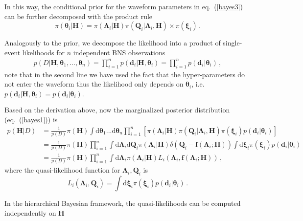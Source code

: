 \documentclass[a4paper,11pt]{article}
\begin{document}
In this way, the conditional prior for the waveform parameters in eq.~(\ref{bayes3}) can be further decomposed with the product rule
\begin{equation}
\label{prior}
\pi(\bm{\theta}_i|\bm{H})=\pi(\bm{\Lambda}_i|\bm{H})\pi(\bm{Q}_i|\bm{\Lambda}_i,\bm{H})\times\pi(\bm{\xi}_i)\,.
\end{equation}

Analogously to the prior, we decompose the likelihood into a product of single-event likelihoods for $n$ independent BNS observations
\begin{subequations}
\begin{align}
p(D|\bm{H},\bm{\theta}_1,...,\bm{\theta}_n)=\prod_{i=1}^{n}p(\bm{d}_i|\bm{H},\bm{\theta}_i)=\prod_{i=1}^{n}p(\bm{d}_i|\bm{\theta}_i)\,,
\end{align}   
\end{subequations}
note that in the second line we have used the fact that the hyper-parameters do not enter the waveform thus the likelihood only depends on $\bm{\theta}_i$, i.e. $p(\bm{d}_i|\bm{H},\bm{\theta}_i)=p(\bm{d}_i|\bm{\theta}_i)$.


Based on the derivation above, now the marginalized posterior distribution (eq.~(\ref{bayes1})) is
\begin{equation}
\label{hierarchical bayes}
\begin{aligned}
p(\bm{H}|D)&=\frac{1}{p(D)}\pi(\bm{H})\int \text{d}\bm{\theta}_1...\text{d}\bm{\theta}_n \prod_{i=1}^n \left[\pi(\bm{\Lambda}_i|\bm{H})\pi(\bm{Q}_i|\bm{\Lambda}_i,\bm{H})\pi(\bm{\xi}_i)p(\bm{d}_i|\bm{\theta}_i)\right] \\
&=\frac{1}{p(D)} \pi(\bm{H}) \prod_{i=1}^n
\int \text{d}\bm{\Lambda}_i\text{d}\bm{Q}_i\pi(\bm{\Lambda}_i|\bm{H})\delta(\bm{Q}_i-\bm{f}(\bm{\Lambda}_i;\bm{H})) \int \text{d}\bm{\xi}_i \pi(\bm{\xi}_i)p(\bm{d}_i|\bm{\theta}_i)\\
&=\frac{1}{p(D)} \pi(\bm{H}) \prod_{i=1}^n
\int \text{d}\bm{\Lambda}_i\pi(\bm{\Lambda}_i|\bm{H})L_i\left(\bm{\Lambda}_i,\bm{f}(\bm{\Lambda}_i;\bm{H})\right)\,,
\end{aligned}
\end{equation}
where the quasi-likelihood function for $\bm{\Lambda}_i,\bm{Q}_i$ is
\begin{equation}
\label{quasi-likelihood}
    L_i(\bm{\Lambda}_i,\bm{Q}_i)=\int \text{d}\bm{\xi}_i \pi(\bm{\xi}_i)p(\bm{d}_i|\bm{\theta}_i)\,.
\end{equation}

In the hierarchical Bayesian framework, the quasi-likelihoods can be computed independently on $\bm{H}$
\end{document}
